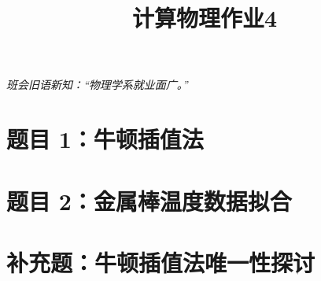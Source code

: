\documentclass[11pt]{article}
\author{
    \makebox[0.8\textwidth]{%
        \centering
        杨远青 \quad 22300190015 \quad
        \href{https://github.com/bud-primordium/Computational-Physics-Fall-2024}{\raisebox{-2pt}{\texttt{[image: ../.utils/comphys.pdf]}}}
    }
}
\title{计算物理作业4}
\begin{document}
\maketitle
\textit{班会旧语新知：“物理学系就业面广。”}
\section{题目 1：牛顿插值法}


\section{题目 2：金属棒温度数据拟合}


\section{补充题：牛顿插值法唯一性探讨}


\vspace{5pt}
\end{document}
